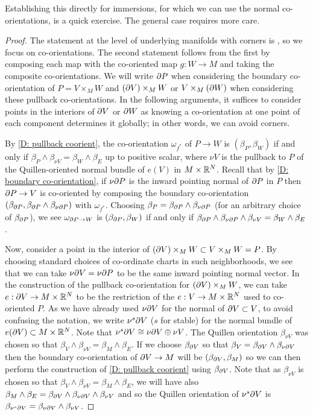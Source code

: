 Establishing this directly for immersions, for which we can use the  normal co-orientations, is a quick exercise.  The general case requires more care.

\begin{proof}
The statement at the level of underlying manifolds with corners is \cite[Proposition 6.7]{Joy12}, so we focus on co-orientations. The second statement follows from the first by composing each map with the co-oriented map $g:W\to M$ and taking the composite co-orientations.  We will write $\partial P$ when considering the boundary co-orientation of $P=V\times_M W$ and $(\partial V)\times_M W$ or $V\times_M (\partial W)$ when considering these pullback co-orientations. In the following arguments, it suffices to consider points in the interiors of $\partial V$ or $\partial W$ as knowing a co-orientation at one point of each component determines it globally; in other words, we can avoid corners.

By \cref{D: pullback coorient}, the co-orientation $\omega_{f^*}$ of $P\to W$ is $(\beta_P,\beta_W)$ if and only if $\beta_P\wedge \beta_{\nu V}=\beta_W\wedge \beta_E$ up to positive scalar, where $\nu V$ is the pullback to $P$ of the Quillen-oriented normal bundle of $e(V)$ in $M\times \mathbb{R}^N$. Recall that by \cref{D: boundary co-orientation}, if $\nu \partial P$ is the inward pointing normal of $\partial P$ in $P$ then $\partial P\to V$ is co-oriented  by composing the boundary co-orientation $(\beta_{\partial P},\beta_{\partial P}\wedge \beta_{\nu \partial P})$ with $\omega_{f^*}$. Choosing $\beta_P= \beta_{\partial P}\wedge \beta_{\nu \partial P}$ (for an arbitrary choice of $\beta_{\partial P}$), we see $\omega_{\partial P\to W}$ is $(\beta_{\partial P},\beta_W)$ if and only if  $\beta_{\partial P}\wedge \beta_{\nu\partial P}\wedge \beta_{\nu V}=\beta_W\wedge \beta_E$.

Now, consider a point in the interior of $(\partial V)\times_MW\subset V\times_MW=P$. By choosing standard choices of co-ordinate charts in such neighborhoods, we see that we can take $\nu\partial V=\nu \partial P$ to be the same inward pointing normal vector. 
In the construction of the pullback co-orientation for $(\partial V)\times_M W$, we can take $e:\partial V\to M\times \mathbb{R}^N$ to be the restriction of the $e:V\to M\times \mathbb{R}^N$ used to co-oriented $P$. As we have already used $\nu \partial V$ for the normal of $\partial V\subset V$, to avoid confusing the notation, we write $\nu^s\partial V$ ($s$ for stable) for the normal bundle of $e(\partial V)\subset M\times \mathbb{R}^N$. Note that $\nu^s\partial V\cong \nu\partial V\oplus \nu V$. The Quillen orientation $\beta_{\nu V}$ was chosen so that $\beta_V\wedge \beta_{\nu V}=\beta_{M}\wedge \beta_E$. If we choose $\beta_{\partial V}$ so that $\beta_V=\beta_{\partial V}\wedge \beta_{\nu\partial V}$ then the boundary co-orientation of $\partial V\to M$ will be $(\beta_{\partial V},\beta_M)$ so we can then perform the construction of \cref{D: pullback coorient} using $\beta_{\partial V}$. Note that as $\beta_{\nu V}$ is chosen so that $\beta_V\wedge \beta_{\nu V}=\beta_M\wedge \beta_E$, we will have also  $\beta_M\wedge \beta_E=\beta_{\partial V}\wedge \beta_{\nu\partial V}\wedge \beta_{\nu V}$ and so the Quillen orientation of $\nu^s\partial V$ is  $\beta_{\nu^s\partial V}=\beta_{\nu\partial V}\wedge \beta_{\nu V}$. 


\end{proof}

